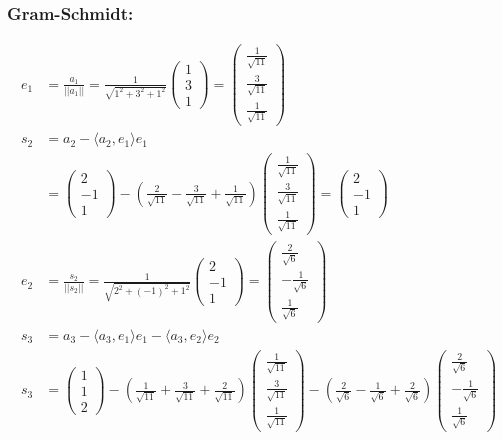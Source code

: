 \documentclass[fleqn]{article}
\begin{document}
\subsubsection*{Gram-Schmidt:}
\begin{equation*}
    \begin{split}
    e_1&=\frac{a_1}{||a_1||}=\frac{1}{\sqrt{1^2+3^2+1^2}}\begin{pmatrix}1\\3\\1\end{pmatrix}=\begin{pmatrix}\frac{1}{\sqrt{11}}\\\frac{3}{\sqrt{11}}\\\frac{1}{\sqrt{11}}\end{pmatrix}\\
    s_2&= a_2 - \langle a_2,e_1\rangle e_1\\
    &= \begin{pmatrix}2\\-1\\1\end{pmatrix} - (\frac{2}{\sqrt{11}}-\frac{3}{\sqrt{11}}+\frac{1}{\sqrt{11}})\begin{pmatrix}\frac{1}{\sqrt{11}}\\\frac{3}{\sqrt{11}}\\\frac{1}{\sqrt{11}}\end{pmatrix}=\begin{pmatrix}2\\-1\\1\end{pmatrix}\\
    e_2&=\frac{s_2}{||s_2||}=\frac{1}{\sqrt{2^2+(-1)^2+1^2}}\begin{pmatrix}2\\-1\\1\end{pmatrix}=\begin{pmatrix}\frac{2}{\sqrt{6}}\\-\frac{1}{\sqrt{6}}\\\frac{1}{\sqrt{6}}\end{pmatrix}\\
    s_3&=a_3 - \langle a_3,e_1\rangle e_1 - \langle a_3,e_2\rangle e_2\\
    s_3&= \begin{pmatrix}1\\1\\2\end{pmatrix} - (\frac{1}{\sqrt{11}}+\frac{3}{\sqrt{11}}+\frac{2}{\sqrt{11}})\begin{pmatrix}\frac{1}{\sqrt{11}}\\\frac{3}{\sqrt{11}}\\\frac{1}{\sqrt{11}}\end{pmatrix}-(\frac{2}{\sqrt{6}}-\frac{1}{\sqrt{6}}+\frac{2}{\sqrt{6}})\begin{pmatrix}\frac{2}{\sqrt{6}}\\-\frac{1}{\sqrt{6}}\\\frac{1}{\sqrt{6}}\end{pmatrix}\\

\end{split}
\end{equation*}
\end{document}
